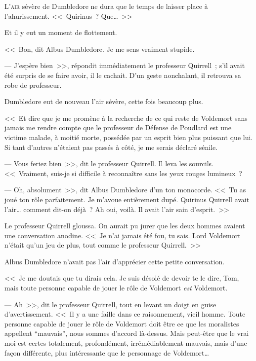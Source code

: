 
\lettrine{L}{'air} sévère de Dumbledore ne dura que le temps de laisser place à l'ahurissement. <<~Quirinus~? Que…~>>

Et il y eut un moment de flottement.

<<~Bon, dit Albus Dumbledore. Je me sens vraiment stupide.

--- J'espère bien~>>, répondit immédiatement le professeur Quirrell~; s'il avait été surpris de se faire avoir, il le cachait. D'un geste nonchalant, il retrouva sa robe de professeur.

Dumbledore eut de nouveau l'air sévère, cette fois beaucoup plus.

<<~Et dire que je me promène à la recherche de ce qui reste de Voldemort sans jamais me rendre compte que le professeur de Défense de Poudlard est une victime malade, à moitié morte, possédée par un esprit bien plus puissant que lui. Si tant d'autres n'étaient pas passés à côté, je me serais déclaré sénile.

--- Vous feriez bien~>>, dit le professeur Quirrell. Il leva les sourcils. <<~Vraiment, suis-je si difficile à reconnaître sans les yeux rouges lumineux~?

--- Oh, absolument~>>, dit Albus Dumbledore d'un ton monocorde. <<~Tu as joué ton rôle parfaitement. Je m'avoue entièrement dupé. Quirinus Quirrell avait l'air… comment dit-on déjà~? Ah oui, voilà. Il avait l'air sain d'esprit.~>>

Le professeur Quirrell gloussa. On aurait pu jurer que les deux hommes avaient une conversation anodine. <<~Je n'ai jamais été fou, tu sais. Lord Voldemort n'était qu'un jeu de plus, tout comme le professeur Quirrell.~>>

Albus Dumbledore n'avait pas l'air d'apprécier cette petite conversation.

<<~Je me doutais que tu dirais cela. Je suis désolé de devoir te le dire, Tom, mais toute personne capable de jouer le rôle de Voldemort \emph{est} Voldemort.

--- Ah~>>, dit le professeur Quirrell, tout en levant un doigt en guise d'avertissement. <<~Il y a une faille dans ce raisonnement, vieil homme. Toute personne capable de jouer le rôle de Voldemort doit être ce que les moralistes appellent “mauvais”, nous sommes d'accord là-dessus. Mais peut-être que le vrai moi est certes totalement, profondément, irrémédiablement mauvais, mais d'une façon différente, plus intéressante que le personnage de Voldemort…

